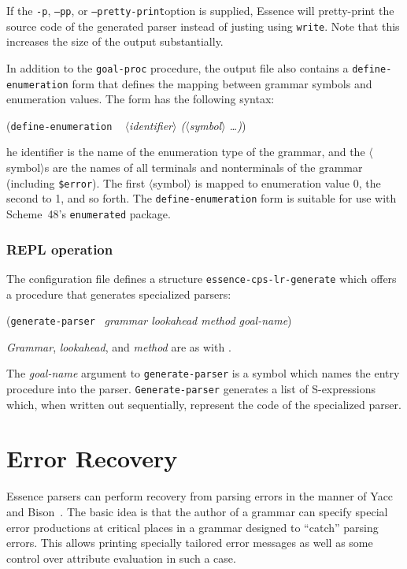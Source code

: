 \documentclass{article}
\newcommand{\meta}[1]{{\noindent\mbox{\textrm{$\langle$#1$\rangle$}}}}
\renewcommand{\var}[1]{\noindent\mbox{\textit{#1}}}
\newcommand{\ide}[1]{{\frenchspacing\textnormal{\texttt{#1}}}}
\newcommand{\pproto}[2]{\unskip%
\mbox{\texonly{\spaceskip=0.5em}#1}%
\mbox{ }\texonly{\nobreak}\htmlonly{ }\textrm{#2}}
\newcommand{\proto}[3]{\par\bigskip\begin{flushleft}\pproto{(\texttt{#1}}{\textit{#2})}\hspace*{\fill}{#3}\end{flushleft}}
\newcommand{\codefont}[1]{\texttt{#1}}
\begin{document}
If the \texttt{-p}, \texttt{--pp}, or \texttt{--pretty-print}option is
supplied, Essence will pretty-print the source code of the generated
parser instead of justing using \texttt{write}.  Note that this
increases the size of the output substantially.

In addition to the \texttt{goal-proc} procedure, the output file also
contains a \texttt{define-\linebreak[0]enumeration} form that defines the mapping
between grammar symbols and enumeration values.  The form has the
following syntax:

\proto{define-enumeration}{ \meta{identifier} (\meta{symbol} \ldots)}

The identifier is the name of the enumeration type of the grammar, and
the \meta{symbol}s are the names of all terminals and nonterminals of
the grammar (including \texttt{\$error}).  The first \meta{symbol} is
mapped to enumeration value 0, the second to 1, and so forth.  The
\texttt{define-enumeration} form is suitable for use with Scheme~48's
\texttt{enumerated} package.

\subsubsection*{REPL operation}
The  configuration file defines a
structure \codefont{essence-cps-lr-generate} which offers a procedure that
generates specialized parsers:

\proto{generate-parser}{grammar lookahead method goal-name}{procedure}
%
\var{Grammar}, \var{lookahead}, and \var{method} are as with
\link{\codefont{parse}}{proc:parse}.

The \var{goal-name} argument to \ide{generate-parser} is a symbol
which names the entry procedure into the parser.
\ide{Generate-parser} generates a list of S-expressions which, when
written out sequentially, represent the code of the specialized
parser.

\section{Error Recovery}
\label{sec:error-recovery}

Essence parsers can perform recovery from parsing errors in the manner
of Yacc~\cite{Johnson1975} and Bison~\cite{DonnellyStallman1995}.  The
basic idea is that the author of a grammar can specify special
error productions at critical places in a grammar designed to ``catch''
parsing errors.  This allows printing specially tailored error
messages as well as some control over attribute evaluation in such a
case.
\end{document}
